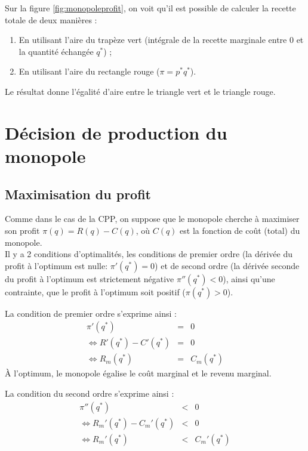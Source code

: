 \documentclass[
]{book}
\providecommand{\tightlist}{%
  \setlength{\itemsep}{0pt}\setlength{\parskip}{0pt}}
\theoremstyle{definition}
\theoremstyle{definition}
\theoremstyle{definition}
\theoremstyle{definition}
\theoremstyle{remark}
\begin{document}
Sur la figure \ref{fig:monopoleprofit}, on voit qu'il est possible de calculer la recette totale de deux manières :

\begin{enumerate}
\def\labelenumi{\arabic{enumi}.}
\tightlist
\item
  En utilisant l'aire du trapèze vert (intégrale de la recette marginale entre 0 et la quantité échangée \(q^*\)) ;
\item
  En utilisant l'aire du rectangle rouge (\(\pi=p^* q^*\)).
\end{enumerate}

Le résultat donne l'égalité d'aire entre le triangle vert et le triangle rouge.

\hypertarget{duxe9cision-de-production-du-monopole}{%
\section{Décision de production du monopole}\label{duxe9cision-de-production-du-monopole}}

\hypertarget{maximisation-du-profit}{%
\subsection{Maximisation du profit}\label{maximisation-du-profit}}

Comme dans le cas de la CPP, on suppose que le monopole cherche à maximiser son profit \(\pi(q)=R(q)-C(q)\), où \(C(q)\) est la fonction de coût (total) du monopole.\\
Il y a 2 conditions d'optimalités, les conditions de premier ordre (la dérivée du profit à l'optimum est nulle: \(\pi'(q^*)=0\)) et de second ordre (la dérivée seconde du profit à l'optimum est strictement négative \(\pi''(q^*)<0\)), ainsi qu'une contrainte, que le profit à l'optimum soit positif (\(\pi(q^*)>0\)).

La condition de premier ordre s'exprime ainsi :
\[
\begin{array}{rcl}
\pi'(q^*) &=&0\\
\Leftrightarrow R'(q^*) - C'(q^*) &=& 0\\
\Leftrightarrow R_m(q^*) &=&C_m(q^*) 
\end{array}
\]
À l'optimum, le monopole égalise le coût marginal et le revenu marginal.

La condition du second ordre s'exprime ainsi :
\[
\begin{array}{rcl}
\pi''(q^*) &<&0\\
\Leftrightarrow R_m'(q^*) - C_m'(q^*) &<& 0\\
\Leftrightarrow R_m'(q^*) &<& C_m'(q^*)
\end{array}
\]
\end{document}
